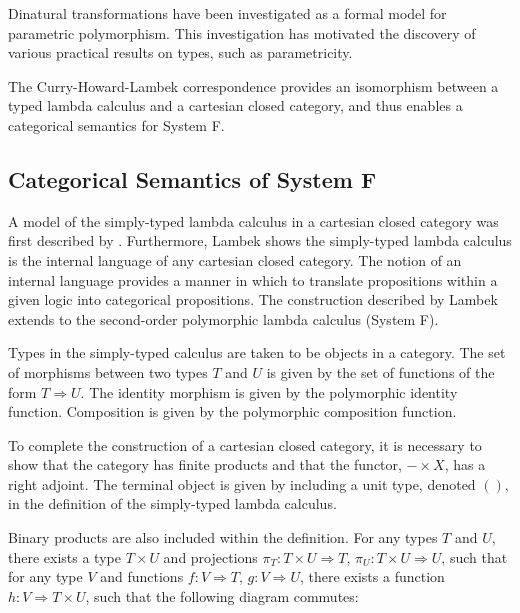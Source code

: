 \documentclass[../../Dissertation.tex]{subfiles}
\begin{document}
Dinatural transformations have been investigated as a formal model for parametric polymorphism. This investigation has motivated the discovery of various practical results on types, such as parametricity.
\par
The Curry-Howard-Lambek correspondence provides an isomorphism between a typed lambda calculus and a cartesian closed category, and thus enables a categorical semantics for System F.

\subsection{Categorical Semantics of System F}\label{sec:systemfcat}
A model of the simply-typed lambda calculus in a cartesian closed category was first described by . Furthermore, Lambek shows the simply-typed lambda calculus is the internal language of any cartesian closed category. The notion of an internal language provides a manner in which to translate propositions within a given logic into categorical propositions. The construction described by Lambek extends to the second-order polymorphic lambda calculus (System F).
\par
Types in the simply-typed calculus are taken to be objects in a category. The set of morphisms between two types $T$ and $U$ is given by the set of functions of the form $T \Rightarrow U$. The identity morphism is given by the polymorphic identity function. Composition is given by the polymorphic composition function.
\par
To complete the construction of a cartesian closed category, it is necessary to show that the category has finite products and that the functor, $- \times X$, has a right adjoint. The terminal object is given by including a unit type, denoted $()$, in the definition of the simply-typed lambda  calculus. 
\par
Binary products are also included within the definition. For any types $T$ and $U$, there exists a type $T \times U$ and projections $\pi_{T} : T \times U \Rightarrow T$, $\pi_{U} : T \times U \Rightarrow U$, such that for any type $V$ and functions $f : V \Rightarrow T$, $g : V \Rightarrow U$, there exists a function $h : V \Rightarrow T \times U$, such that the following diagram commutes:
\end{document}
